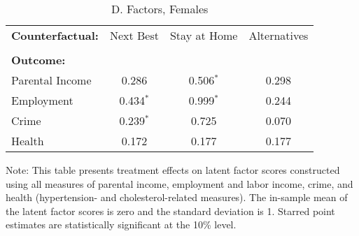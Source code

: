 




\begin{table}[H] 
\begin{threeparttable}
\caption{D. Factors, Females}
\centering 
\begin{tabular}{lccc} \toprule
\textbf{Counterfactual:} & Next Best & Stay at Home & Alternatives \\ \\

\textbf{Outcome:} &    \\
Parental Income   &  0.286         & 0.506$^*$ & 0.298 \\ 
Employment         &  0.434$^*$  & 0.999$^*$ & 0.244 \\  
Crime                    & 0.239$^*$  & 0.725 & 0.070 \\ 
Health                   &  0.172 & 0.177 & 0.177 \\ \bottomrule
\end{tabular}
\begin{tablenotes}
\footnotesize
\item Note: This table presents treatment effects on latent factor scores constructed using all measures of parental income, employment and labor income, crime, and health (hypertension- and cholesterol-related measures). The in-sample mean of the latent factor scores is zero and the standard deviation is 1. Starred point estimates are statistically significant at the 10\% level. 
\end{tablenotes}
\end{threeparttable}
\end{table}


